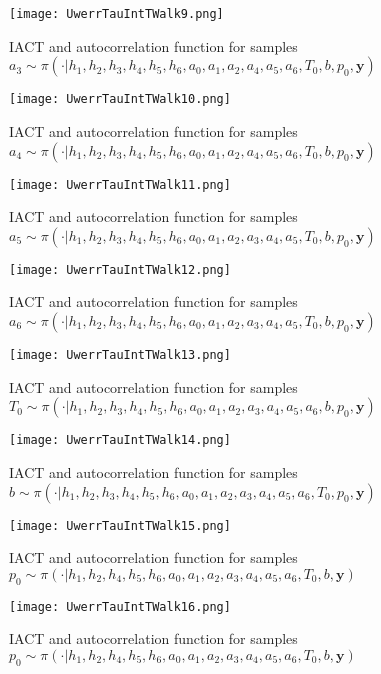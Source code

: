 \begin{figure}[ht!]
	\centering
	\texttt{[image: UwerrTauIntTWalk9.png]}
	\caption[IACT and autocorrelation function for $a_3$ samples.]{IACT and autocorrelation function for samples $a_3 \sim \pi( \cdot | h_1, h_2,h_3,h_4,h_5,h_6,a_0,a_1,a_2,a_4,a_5,a_6,T_0,b,p_0,  \bm{y})$}
	\label{fig:}
\end{figure}

\begin{figure}[ht!]
	\centering
	\texttt{[image: UwerrTauIntTWalk10.png]}
	\caption[IACT and autocorrelation function for $a_4 $ samples.]{IACT and autocorrelation function for samples $a_4 \sim \pi( \cdot | h_1, h_2,h_3,h_4,h_5,h_6,a_0,a_1,a_2,a_4,a_5,a_6,T_0,b,p_0,  \bm{y})$}
	\label{fig:}
\end{figure}


\begin{figure}[ht!]
	\centering
	\texttt{[image: UwerrTauIntTWalk11.png]}
	\caption[IACT and autocorrelation function for $a_5$ samples.]{IACT and autocorrelation function for samples $a_5 \sim \pi( \cdot | h_1, h_2,h_3,h_4,h_5,h_6,a_0,a_1,a_2,a_3,a_4,a_5,T_0,b,p_0,  \bm{y})$}
	\label{fig:}
\end{figure}
\begin{figure}[ht!]
	\centering
	\texttt{[image: UwerrTauIntTWalk12.png]}
	\caption[IACT and autocorrelation function for $a_6$ samples.]{IACT and autocorrelation function for samples $a_6 \sim \pi( \cdot | h_1, h_2,h_3,h_4,h_5,h_6,a_0,a_1,a_2,a_3,a_4,a_5,T_0,b,p_0,  \bm{y})$}
	\label{fig:}
\end{figure}
\begin{figure}[ht!]
	\centering
	\texttt{[image: UwerrTauIntTWalk13.png]}
	\caption[IACT and autocorrelation function for $T_0$ samples.]{IACT and autocorrelation function for samples $T_0 \sim \pi( \cdot | h_1, h_2,h_3,h_4,h_5,h_6,a_0,a_1,a_2,a_3,a_4,a_5,a_6,b,p_0,  \bm{y})$}
	\label{fig:}
\end{figure}
\begin{figure}[ht!]
	\centering
	\texttt{[image: UwerrTauIntTWalk14.png]}
	\caption[IACT and autocorrelation function for $b$ samples.]{IACT and autocorrelation function for samples $b \sim \pi( \cdot | h_1, h_2,h_3,h_4,h_5,h_6,a_0,a_1,a_2,a_3,a_4,a_5,a_6,T_0,p_0,  \bm{y})$}
	\label{fig:}
\end{figure}

\begin{figure}[ht!]
	\centering
	\texttt{[image: UwerrTauIntTWalk15.png]}
	\caption[IACT and autocorrelation function for $p_0$ samples]{IACT and autocorrelation function for samples $p_0 \sim \pi( \cdot | h_1,h_2,h_4,h_5,h_6,a_0,a_1,a_2,a_3,a_4,a_5,a_6,T_0,b, \bm{y})$}
	\label{fig:}
\end{figure}
\begin{figure}[ht!]
	\centering
	\texttt{[image: UwerrTauIntTWalk16.png]}
	\caption[IACT and autocorrelation function for $p_0$ samples]{IACT and autocorrelation function for samples $p_0 \sim \pi( \cdot | h_1,h_2,h_4,h_5,h_6,a_0,a_1,a_2,a_3,a_4,a_5,a_6,T_0,b, \bm{y})$}
	\label{fig:}
\end{figure}

